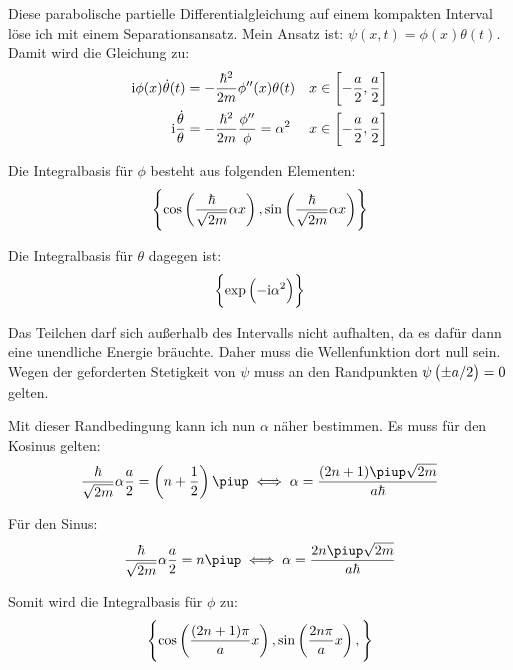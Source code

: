 Diese parabolische partielle Differentialgleichung auf einem kompakten Interval
löse ich mit einem Separationsansatz. Mein Ansatz ist: $\psi(x, t) = \phi(x)
\theta(t)$. Damit wird die Gleichung zu:
\begin{align*}
	\ii \phi(x) \dot \theta(t) &= -\frac{\hbar^2}{2m} \phi''(x) \theta(t) &x \in \intcc{-\frac a2, \frac a2} \\
	\ii \frac{\dot \theta}\theta &= -\frac{\hbar^2}{2m} \frac{\phi''}\phi = \alpha^2 &x \in \intcc{-\frac a2, \frac a2} \\
\end{align*}

Die Integralbasis für $\phi$ besteht aus folgenden Elementen:
\[
	\set{
		\cos\del{\frac\hbar{\sqrt{2m}}\alpha x},
		\sin\del{\frac\hbar{\sqrt{2m}}\alpha x}
	}
\]

Die Integralbasis für $\theta$ dagegen ist:
\[
	\set{
		\exp\del{
			- \ii \alpha^2
		}
	}
\]

Das Teilchen darf sich außerhalb des Intervalls nicht aufhalten, da es dafür
dann eine unendliche Energie bräuchte. Daher muss die Wellenfunktion dort null
sein. Wegen der geforderten Stetigkeit von $\psi$ muss an den Randpunkten
$\psi\del{\pm a/2} = 0$ gelten.

Mit dieser Randbedingung kann ich nun $\alpha$ näher bestimmen. Es muss für den
Kosinus gelten:
\[
	\frac\hbar{\sqrt{2m}}\alpha \frac a2 = \del{n + \half} \piup
	\iff
	\alpha = \frac{(2n+1)\piup \sqrt{2m}}{a\hbar}
\]

Für den Sinus:
\[
	\frac\hbar{\sqrt{2m}}\alpha \frac a2 = n\piup
	\iff
	\alpha = \frac{2n\piup \sqrt{2m}}{a\hbar}
\]

Somit wird die Integralbasis für $\phi$ zu:
\[
	\set{
		\cos\del{\frac{(2n+1)\pi}{a} x},
		\sin\del{\frac{2n\pi}{a} x},
	}
\]


\IfFileExists{\bibliographyfile}{
	
	
}{}



